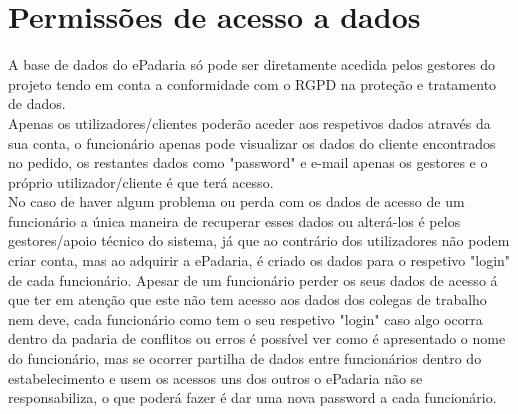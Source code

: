 \section{Permissões de acesso a dados}
A base de dados do ePadaria só pode ser diretamente acedida pelos gestores do projeto tendo em conta a conformidade com o RGPD na proteção e tratamento de dados.\\
Apenas os utilizadores/clientes poderão aceder aos respetivos dados através da sua conta, o funcionário apenas pode visualizar os dados do cliente encontrados no pedido, os restantes dados como "password" e e-mail apenas os gestores e o próprio utilizador/cliente é que terá acesso.\\
No caso de haver algum problema ou perda com os dados de acesso de um funcionário a única maneira de recuperar esses dados ou alterá-los é pelos gestores/apoio técnico do sistema, já que ao contrário dos utilizadores não podem criar conta, mas ao adquirir a ePadaria, é criado os dados para o respetivo "login" de cada funcionário. Apesar de um funcionário perder os seus dados de acesso á que ter em atenção que este não tem acesso aos dados dos colegas de trabalho nem deve, cada funcionário como tem o seu respetivo "login" caso algo ocorra dentro da padaria de conflitos ou erros é possível ver como é apresentado o nome do funcionário, mas se ocorrer partilha de dados entre funcionários dentro do estabelecimento e usem os acessos uns dos outros o ePadaria não se responsabiliza, o que poderá fazer é dar uma nova password a cada funcionário.

